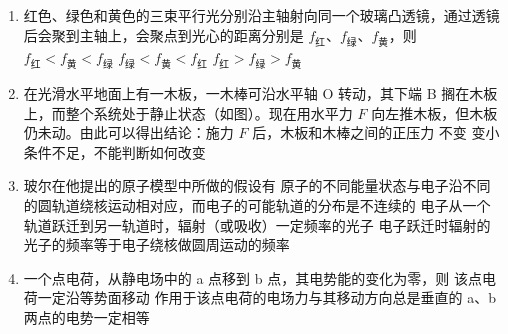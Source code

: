 \documentclass[\gkver]{gaokaozhenti}
\begin{document}
\begin{enumerate}
\item
红色、绿色和黄色的三束平行光分别沿主轴射向同一个玻璃凸透镜，通过透镜后会聚到主轴上，会聚点到光心的距离分别是 $f_{\text{红}}$、$f_{\text{绿}}$、$f_{\text{黄}}$，则
{$f_{\text{红}}<f_{\text{黄}}<f_{\text{绿}}$}
{$f_{\text{绿}}<f_{\text{黄}}<f_{\text{红}}$}
{$f_{\text{红}}>f_{\text{绿}}>f_{\text{黄}}$}


\item
在光滑水平地面上有一木板，一木棒可沿水平轴 O 转动，其下端 B 搁在木板上，而整个系统处于静止状态（如图）。现在用水平力 $F$ 向左推木板，但木板仍未动。由此可以得出结论：施力 $F$ 后，木板和木棒之间的正压力
\onepicture[w=3.78cm]{}
{不变}
{变小}
{条件不足，不能判断如何改变}


\item
玻尔在他提出的原子模型中所做的假设有
{原子的不同能量状态与电子沿不同的圆轨道绕核运动相对应，而电子的可能轨道的分布是不连续的}
{电子从一个轨道跃迁到另一轨道时，辐射（或吸收）一定频率的光子}
{电子跃迁时辐射的光子的频率等于电子绕核做圆周运动的频率}


\item
一个点电荷，从静电场中的 a 点移到 b 点，其电势能的变化为零，则
{该点电荷一定沿等势面移动}
{作用于该点电荷的电场力与其移动方向总是垂直的}
{a、b 两点的电势一定相等}


\end{enumerate}
\end{document}
